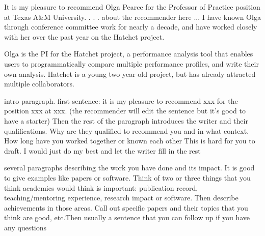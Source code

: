 \documentclass[11pt]{article}
\begin{document}
It is my pleasure to recommend Olga Pearce for the Professor of Practice position at Texas A\&M University.
. . . about the recommender here ...
I have known Olga through conference committee work for nearly a decade, and have worked closely with her over the past year on the Hatchet project.


Olga is the PI for the Hatchet project, a performance analysis tool that enables users to programmatically compare multiple performance profiles, and write their own analysis.  Hatchet is a young two year old project, but has already attracted multiple collaborators.




intro paragraph. first sentence: it is my pleasure to recommend xxx for the position xxx at xxx. (the recommender will edit the sentence but it's good to have a starter) Then the rest of the paragraph introduces the writer and their qualifications. Why are they qualified to recommend you and in what context. How long have you worked together or known each other This is hard for you to draft. I would just do my best and let the writer fill in the rest


several paragraphs describing the work you have done and its impact. It is good to give examples like papers or software. Think of two or three things that you think academics would think is important: publication record, teaching/mentoring experience, research impact or software. Then describe achievements in those areas. Call out specific papers and their topics that you think are good, etc.Then usually a sentence that you can follow up if you have any questions
\end{document}
